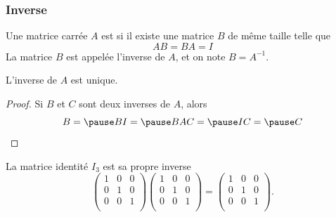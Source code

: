 \subsubsection{Inverse}
\begin{frame}
  \begin{definition}
    Une matrice carrée \(A\) est  si il existe une matrice \(B\) de même taille telle que
    \begin{equation*}
      AB = BA = I
    \end{equation*}\pause{}
    La matrice \(B\) est appelée l'inverse de \(A\), et on note \(B = A^{-1}\).
  \end{definition}\pause{}
  \begin{proposition}
    L'inverse de \(A\) est unique.
  \end{proposition}
  \begin{proof}
    Si \(B\) et \(C\) sont deux inverses de \(A\), alors
    \begin{equation*}
      B =\pause BI =\pause BAC =\pause IC =\pause C
    \end{equation*}
  \end{proof}\pause{}
\end{frame}
\begin{frame}
  \begin{example}
    La matrice identité \(I_{3}\) est sa propre inverse
    \begin{equation*}
      \begin{pmatrix}
        1 & 0 & 0\\
        0 & 1 & 0\\
        0 & 0 & 1\\
      \end{pmatrix}
      \begin{pmatrix}
        1 & 0 & 0\\
        0 & 1 & 0\\
        0 & 0 & 1\\
      \end{pmatrix}
      = \begin{pmatrix}
        1 & 0 & 0\\
        0 & 1 & 0\\
        0 & 0 & 1\\
      \end{pmatrix}.
    \end{equation*}
  \end{example}\pause{}
\end{frame}

